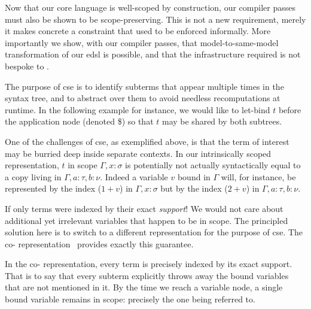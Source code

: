 
Now that our core language is well-scoped by construction, our compiler passes must also be shown to be scope-preserving.
%
This is not a new requirement, merely it makes concrete a constraint that used to be enforced informally.
%
More importantly we show, with our compiler passes, that model-to-same-model transformation of our \ac{edsl} is possible, and that the infrastructure required is not bespoke to \Velo{}.

The purpose of \ac{cse} is to identify subterms that appear multiple times in the syntax tree, and to abstract over them to avoid needless recomputations at runtime.
%
In the following example for instance, we would like to let-bind $t$ before the application node (denoted \$) so that $t$ may be shared by both subtrees.

\begin{center}
  \cseexamplegraph{}
\end{center}

One of the challenges of \ac{cse}, as exemplified above, is that the term of interest may be burried deep inside separate contexts.
%
In our intrinsically scoped representation, $t$ in scope $\Gamma, x : \sigma$ is potentially not actually syntactically equal to a copy living in $\Gamma, a : \tau, b : \nu$.
%
Indeed a variable $v$ bound in $\Gamma$ will, for instance, be represented by the \DeBruijn{} index ($1+v$) in $\Gamma, x : \sigma$ but by the index ($2+v$) in $\Gamma, a :  \tau, b : \nu$.

If only terms were indexed by their exact \emph{support}!
%
We would not care about additional yet irrelevant variables that happen to be in scope.
%
The principled solution here is to switch to a different representation for the purpose of \ac{cse}.
%
The co-\DeBruijn{} representation~\cite{DBLP:journals/corr/abs-1807-04085} provides exactly this guarantee.


In the co-\DeBruijn{} representation, every term is precisely indexed by its exact support.
%
That is to say that every subterm explicitly throws away the bound variables that are not mentioned in it.
%
By the time we reach a variable node, a single bound variable remains in scope:
%
precisely the one being referred to.

